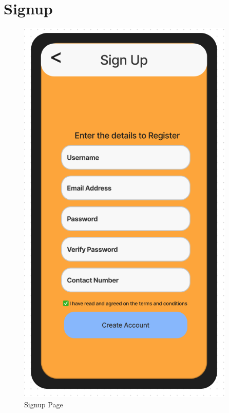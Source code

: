 \documentclass[title page]{article}
\begin{document}
\section{Signup}
\begin{figure}[!h]
    \begin{center}
          \includegraphics[height=19cm]{images/signup.png}
          \caption{Signup Page}
          \label{fig:signup}
    \end{center}
\end{figure}
\end{document}
